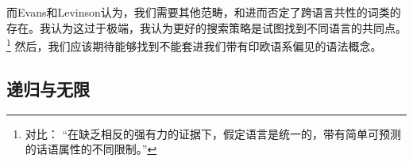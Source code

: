 而Evans和Levinson认为，我们需要其他范畴，\citet[]{Haspelmath2009a}和\citet[]{Croft2009a}进而否定了跨语言共性的词类的存在。我认为这过于极端，我认为更好的搜索策略是试图找到不同语言的共同点。\footnote{
对比：
“在缺乏相反的强有力的证据下，假定语言是统一的，带有简单可预测的话语属性的不同限制。”
} 
然后，我们应该期待能够找到不能套进我们带有印欧语系偏见的语法概念。

\subsection{递归与无限}
\label{Abschnitt-Rekursion}

